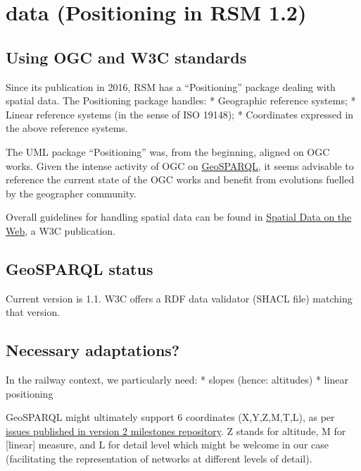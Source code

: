 \documentclass[
  11pt,
]{article}
\begin{document}
\hypertarget{data-positioning-in-rsm-1.2}{%
\section{data (Positioning in RSM
1.2)}\label{data-positioning-in-rsm-1.2}}

\hypertarget{using-ogc-and-w3c-standards}{%
\subsection{Using OGC and W3C
standards}\label{using-ogc-and-w3c-standards}}

Since its publication in 2016, RSM has a ``Positioning'' package dealing
with spatial data. The Positioning package handles: * Geographic
reference systems; * Linear reference systems (in the sense of ISO
19148); * Coordinates expressed in the above reference systems.

The UML package ``Positioning'' was, from the beginning, aligned on OGC
works. Given the intense activity of OGC on
\href{https://www.ogc.org/standard/geosparql/}{GeoSPARQL}, it seems
advisable to reference the current state of the OGC works and benefit
from evolutions fuelled by the geographer community.

Overall guidelines for handling spatial data can be found in
\href{https://www.w3.org/TR/sdw-bp/}{Spatial Data on the Web}, a W3C
publication.

\hypertarget{geosparql-status}{%
\subsection{GeoSPARQL status}\label{geosparql-status}}

Current version is 1.1. W3C offers a RDF data validator (SHACL file)
matching that version.

\hypertarget{necessary-adaptations}{%
\subsection{Necessary adaptations?}\label{necessary-adaptations}}

In the railway context, we particularly need: * slopes (hence:
altitudes) * linear positioning

GeoSPARQL might ultimately support 6 coordinates (X,Y,Z,M,T,L), as per
\href{https://github.com/opengeospatial/ogc-geosparql/milestone/3}{issues
published in version 2 milestones repository}. Z stands for altitude, M
for {[}linear{]} measure, and L for detail level which might be welcome
in our case (facilitating the representation of networks at different
levels of detail).
\end{document}
